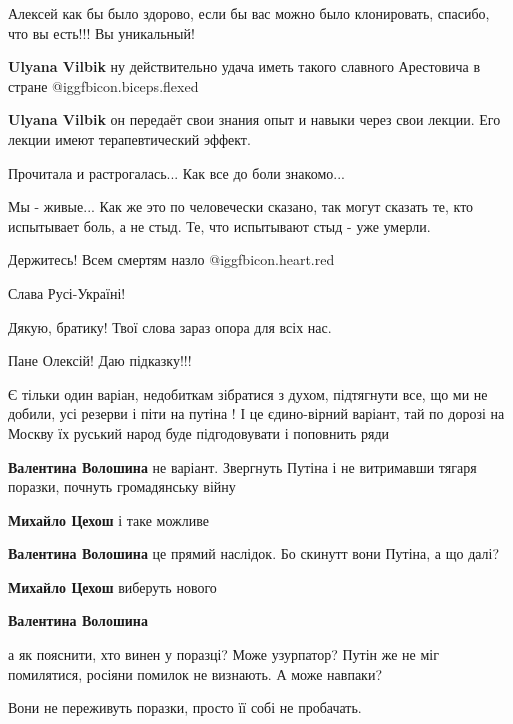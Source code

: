 \begin{itemize}
Алексей как бы было здорово, если бы вас можно было клонировать, спасибо, что вы есть!!! Вы уникальный!

\begin{itemize} %
\textbf{Ulyana Vilbik} ну действительно удача иметь такого славного Арестовича в стране @igg{fbicon.biceps.flexed} 

\textbf{Ulyana Vilbik} он передаёт свои знания опыт и навыки через свои лекции. Его лекции имеют терапевтический эффект.
\end{itemize} %


Прочитала и растрогалась... Как все до боли знакомо...

Мы - живые... Как же это по человечески сказано, так могут сказать те, кто
испытывает боль, а не стыд. Те, что испытывают стыд - уже умерли.

Держитесь! Всем смертям назло @igg{fbicon.heart.red}

Слава Русі-Україні!

Дякую, братику! Твої слова зараз опора для всіх нас.


Пане Олексій! Даю підказку!!!

Є тільки один варіан, недобиткам зібратися з духом, підтягнути все, що ми не
добили, усі резерви і піти на путіна ! І це єдино-вірний варіант, тай по
дорозі на Москву їх руський народ буде підгодовувати і поповнить ряди

\begin{itemize} %
\textbf{Валентина Волошина} не варіант. Звергнуть Путіна і не витримавши тягаря поразки, почнуть громадянську війну

\textbf{Михайло Цехош} і таке можливе

\textbf{Валентина Волошина} це прямий наслідок.
Бо скинутт вони Путіна, а що далі?

\textbf{Михайло Цехош} виберуть нового

\textbf{Валентина Волошина} 

а як пояснити, хто винен у поразці? Може узурпатор? Путін же не міг помилятися,
росіяни помилок не визнають. А може навпаки?

Вони не переживуть поразки, просто її собі не пробачать.


\end{itemize}
\end{itemize}
